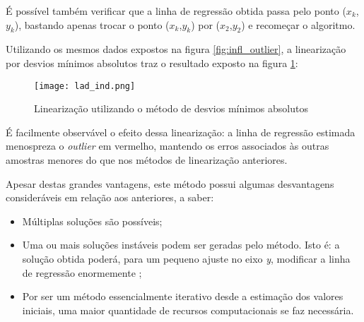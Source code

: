 É possível também verificar que a linha de regressão obtida passa pelo ponto ($x_k$,$y_k$), bastando apenas trocar o ponto ($x_k$,$y_k$) por ($x_2$,$y_2$) e recomeçar o algoritmo.


Utilizando os mesmos dados expostos na figura \ref{fig:infl_outlier}, a linearização por desvios mínimos absolutos traz o resultado exposto na figura \ref{fig:lad}:

\begin{figure}[H]
    \centering
    \texttt{[image: lad\_ind.png]}
    \caption{Linearização utilizando o método de desvios mínimos absolutos}
    \label{fig:lad}
\end{figure}

É facilmente observável o efeito dessa linearização: a linha de regressão estimada menospreza o \textit{outlier} em vermelho, mantendo os erros associados às outras amostras menores do que nos métodos de linearização anteriores.


Apesar destas grandes vantagens, este método possui algumas desvantagens consideráveis em relação aos anteriores, a saber:

\begin{itemize}
  \item Múltiplas soluções são possíveis;
  \item Uma ou mais soluções instáveis podem ser geradas pelo método. Isto é: a solução obtida poderá, para um pequeno ajuste no eixo \textit{y}, modificar a linha de regressão enormemente \cite{instabilitylad};
  \item Por ser um método essencialmente iterativo desde a estimação dos valores iniciais, uma maior quantidade de recursos computacionais se faz necessária.
\end{itemize}
